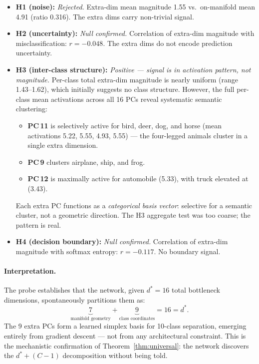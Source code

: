 \documentclass[11pt,letterpaper]{article}
\begin{document}
\begin{itemize}
  \item \textbf{H1 (noise):} \emph{Rejected.}  Extra-dim mean magnitude
    1.55 vs.\ on-manifold mean 4.91 (ratio 0.316).  The extra dims carry
    non-trivial signal.
  \item \textbf{H2 (uncertainty):} \emph{Null confirmed.}  Correlation of
    extra-dim magnitude with misclassification: $r = -0.048$.  The extra
    dims do not encode prediction uncertainty.
  \item \textbf{H3 (inter-class structure):} \emph{Positive — signal is
    in activation \emph{pattern}, not magnitude.}  Per-class total
    extra-dim magnitude is nearly uniform (range 1.43--1.62), which
    initially suggests no class structure.  However, the full
    per-class mean activations across all 16 PCs reveal systematic
    semantic clustering:
    \begin{itemize}[nosep]
      \item \textbf{PC\,11} is selectively active for bird, deer, dog,
        and horse (mean activations 5.22, 5.55, 4.93, 5.55) —
        the four-legged animals cluster in a single extra dimension.
      \item \textbf{PC\,9} clusters airplane, ship, and frog.
      \item \textbf{PC\,12} is maximally active for automobile (5.33),
        with truck elevated at (3.43).
    \end{itemize}
    Each extra PC functions as a \emph{categorical basis vector}:
    selective for a semantic cluster, not a geometric direction.
    The H3 aggregate test was too coarse; the pattern is real.
  \item \textbf{H4 (decision boundary):} \emph{Null confirmed.}
    Correlation of extra-dim magnitude with softmax entropy:
    $r = -0.117$.  No boundary signal.
\end{itemize}

\paragraph{Interpretation.}
The probe establishes that the network, given $d^* = 16$ total bottleneck
dimensions, spontaneously partitions them as:
\begin{equation}
  \underbrace{7}_{\text{manifold geometry}} +
  \underbrace{9}_{\text{class coordinates}} = 16 = d^*.
\end{equation}
The 9 extra PCs form a learned simplex basis for 10-class separation,
emerging entirely from gradient descent — not from any architectural
constraint.  This is the mechanistic confirmation of
Theorem~\ref{thm:universal}: the network discovers the
$d^* + (C-1)$ decomposition without being told.
\end{document}
